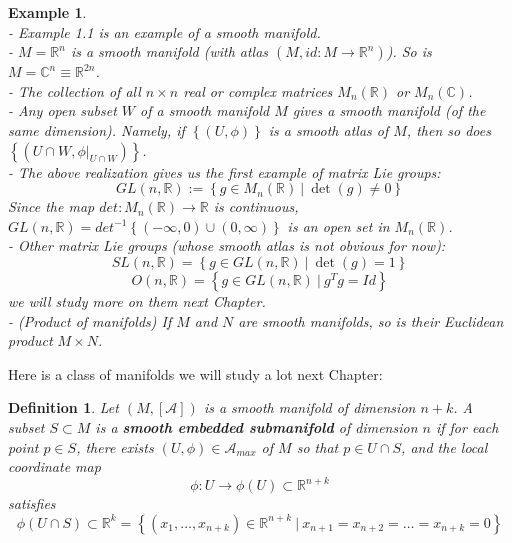 \documentclass[11pt]{book}
\newtheorem{example}[theorem]{Example}
\newtheorem{definition}[theorem]{Definition}
\newcommand{\bb}[1]{\mathbb{#1}}
\newcommand{\mc}[1]{\mathcal{#1}}
\begin{document}
\begin{example}\mbox{}\\
- Example 1.1 is an example of a smooth manifold.\\
- $M = \bb{R}^n$ is a smooth manifold (with atlas $(M, id: M \to \bb{R}^n)$). So is $M = \bb{C}^n \equiv \bb{R}^{2n}$.\\
- The collection of all $n \times n$ real or complex matrices $M_{n}(\bb{R})$ or $M_{n}(\bb{C})$.\\
- Any open subset $W$ of a smooth manifold $M$ gives a smooth manifold (of the same dimension). Namely, if $\left\{(U,\phi)\right\}$ is a smooth atlas of $M$, then so does $\left\{(U \cap W, \phi  \Big|_{U \cap W})\right\}$.\\
- The above realization gives us the first example of matrix Lie groups:
$$GL(n,\bb{R}) := \left\{ g \in M_{n}(\bb{R})\ \Big|\ \det(g) \neq 0 \right\} $$
Since the map $det: M_n(\bb{R}) \to \bb{R}$ is continuous, $GL(n,\bb{R}) = det^{-1}\left\{(-\infty,0)\cup(0,\infty)\right\}$ is an open set in $M_n(\bb{R})$.\\
- Other matrix Lie groups (whose smooth atlas is not obvious for now):\\
$$SL(n,\bb{R}) = \left\{ g \in GL(n,\bb{R})\ \Big|\ \det(g) = 1 \right\}$$
$$O(n,\bb{R}) = \left\{ g \in GL(n,\bb{R})\ \Big|\ g^Tg = Id \right\}$$
we will study more on them next Chapter.\\
- (Product of manifolds) If $M$ and $N$ are smooth manifolds, so is their Euclidean product $M \times N$.
\end{example}
Here is a class of manifolds we will study a lot next Chapter:
\begin{definition}\label{sub}
Let $(M,[\mc{A}])$ is a smooth manifold of dimension $n+k$. A subset $S \subset M$ is a \textbf{smooth embedded submanifold} of dimension $n$ if for each point $p \in S$, there exists $(U, \phi) \in \mc{A}_{max}$ of $M$ so that $p \in U \cap S$, and the local coordinate map
$$\phi : U \to \phi(U) \subset \bb{R}^{n+k}$$
satisfies
$$\phi(U \cap S) \subset \bb{R}^k = \left\{ (x_1, \dots, x_{n+k}) \in \bb{R}^{n+k}\ \Big|\ x_{n+1} = x_{n+2} = \dots = x_{n+k} = 0 \right\}$$
\end{definition}
\end{document}
